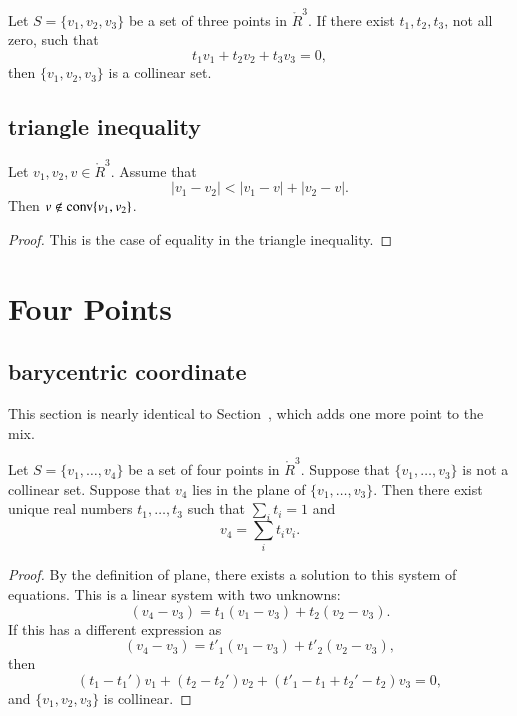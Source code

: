 \begin{lemma}
Let $S = \{v_1,v_2,v_3\}$ be a set of three
points in $\ring{R}^3$.  If there exist $t_1,t_2,t_3$, not all zero,
such that  $$
           t_1 v_1 + t_2 v_2 + t_3 v_3 = 0,
           $$
then $\{v_1,v_2,v_3\}$ is a collinear set.
\end{lemma}



\newpage

\subsection{triangle inequality}

\begin{lemma} 
Let $v_1,v_2,v\in\ring{R}^3$.  
Assume that
	$$|v_1-v_2| < |v_1-v| + |v_2 - v|.$$
Then $v\not\in{\operatorname{conv}}\{v_1,v_2\}$.
\end{lemma}

\begin{proof}
This is the case of equality in the triangle inequality.
\end{proof}

\newpage


\section{Four Points}

\subsection{barycentric coordinate}

This section is nearly identical to Section~, which adds one more point
to the mix.

\begin{lemma}
Let $S=\{v_1,\ldots,v_4\}$ be
a set of four points in $\ring{R}^3$.  Suppose
that $\{v_1,\ldots,v_3\}$ is not a collinear
set.   Suppose that $v_4$ lies in the plane of
$\{v_1,\ldots,v_3\}$.  
Then there exist unique real numbers
$t_1,\ldots,t_3$ such that $\sum_i t_i = 1$ and
	$$v_4 = \sum_i t_i v_i.$$
\end{lemma}

\begin{proof}  By the definition of plane,
there 
exists a solution to this system of equations.
This is a linear system with
two unknowns:
	$$(v_4- v_3) = t_1 (v_1-v_3) +
		t_2 (v_2-v_3).
	$$
If this has a different expression as
   $$
   (v_4- v_3) = t'_1 (v_1-v_3) +
		t'_2 (v_2-v_3),
   $$
then 
  $$
  (t_1-t_1') v_1 + (t_2-t_2') v_2 + (t'_1-t_1+t_2'-t_2) v_3 = 0,
  $$
and $\{v_1,v_2,v_3\}$ is collinear.
\end{proof}

